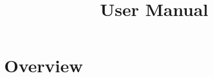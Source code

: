 \documentclass[a4paper,11pt]{article}
\title{\vna{} User Manual}
\begin{document}
\maketitle


\setcounter{tocdepth}{3}
\tableofcontents
\clearpage

%

\section{Overview}
\end{document}
